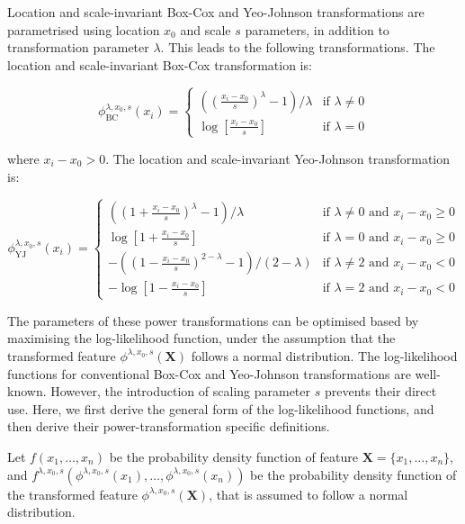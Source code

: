 \documentclass[preprint,12pt,authoryear]{elsarticle}
\begin{document}
Location and scale-invariant Box-Cox and Yeo-Johnson transformations are
parametrised using location \(x_0\) and scale \(s\) parameters, in
addition to transformation parameter \(\lambda\). This leads to the
following transformations. The location and scale-invariant Box-Cox
transformation is:

\begin{equation}
\phi_{\text{BC}}^{\lambda, x_0, s} (x_i) = 
\begin{cases}
\left( \left(\frac{x_i - x_0}{s} \right)^\lambda - 1 \right) / \lambda & \text{if } \lambda \neq 0\\
\log\left[\frac{x_i - x_0}{s}\right] & \text{if } \lambda = 0
\end{cases}
\end{equation}

where \(x_i - x_0 > 0\). The location and scale-invariant Yeo-Johnson
transformation is:

\begin{equation}
\phi_{\text{YJ}}^{\lambda, x_0, s} (x_i) = 
\begin{cases}
\left( \left( 1 + \frac{x_i - x_0}{s}\right)^\lambda - 1\right) / \lambda & \text{if } \lambda \neq 0 \text{ and } x_i - x_0 \geq 0\\
\log\left[1 + \frac{x_i - x_0}{s}\right] & \text{if } \lambda = 0 \text{ and } x_i - x_0 \geq 0\\
-\left( \left( 1 - \frac{x_i - x_0}{s}\right)^{2 - \lambda} - 1 \right) / \left(2 - \lambda \right) & \text{if } \lambda \neq 2 \text{ and } x_i - x_0 < 0\\
-\log\left[1 - \frac{x_i - x_0}{s}\right] & \text{if } \lambda = 2 \text{ and } x_i - x_0 < 0
\end{cases}
\end{equation}

The parameters of these power transformations can be optimised based by
maximising the log-likelihood function, under the assumption that the
transformed feature \(\phi^{\lambda, x_0, s} (\mathbf{X})\) follows a
normal distribution. The log-likelihood functions for conventional
Box-Cox and Yeo-Johnson transformations are well-known. However, the
introduction of scaling parameter \(s\) prevents their direct use. Here,
we first derive the general form of the log-likelihood functions, and
then derive their power-transformation specific definitions.

Let \(f(x_1, \ldots, x_n)\) be the probability density function of
feature \(\mathbf{X} = \{ x_1, \ldots, x_n\}\), and
\(f^{\lambda, x_0, s} (\phi^{\lambda, x_0, s}(x_1), \ldots, \phi^{\lambda, x_0, s}(x_n))\)
be the probability density function of the transformed feature
\(\phi^{\lambda, x_0, s} (\mathbf{X})\), that is assumed to follow a
normal distribution.
\end{document}
